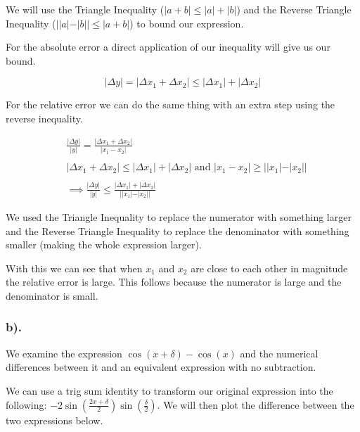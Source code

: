 \documentclass[11pt]{article}
\begin{document}
    We will use the Triangle Inequality (\(|a + b|\leq |a| + |b|\)) and the
Reverse Triangle Inequality (\(||a|-|b||\leq|a + b|\)) to bound our
expression.

For the absolute error a direct application of our inequality will give
us our bound.

\[
\boxed{|\Delta y| = |\Delta x_1 + \Delta x_2|\leq|\Delta x_1| + |\Delta x_2|}
\]

For the relative error we can do the same thing with an extra step using
the reverse inequality.

\begin{align}
    &\frac{|\Delta y|}{|y|}=\frac{|\Delta x_1 + \Delta x_2|}{|x_1 - x_2|}\\
    &~\\
    &|\Delta x_1 + \Delta x_2|\leq |\Delta x_1| + |\Delta x_2| \text{ and } |x_1 - x_2|\geq ||x_1| - |x_2||\\
    &~\\
    &\implies \boxed{\frac{|\Delta y|}{|y|}\leq \frac{|\Delta x_1| + |\Delta x_2|}{||x_1| - |x_2||}}
\end{align}

We used the Triangle Inequality to replace the numerator with something
larger and the Reverse Triangle Inequality to replace the denominator
with something smaller (making the whole expression larger).

    With this we can see that when \(x_1\) and \(x_2\) are close to each
other in magnitude the relative error is large. This follows because the
numerator is large and the denominator is small.

    \hypertarget{b.}{%
\subsubsection*{b).}\label{b.}}

We examine the expression \(\cos(x+\delta)-\cos(x)\) and the numerical
differences between it and an equivalent expression with no subtraction.

    We can use a trig sum identity to transform our original expression into
the following: \(-2\sin(\frac{2x+\delta}{2})\sin(\frac{\delta}{2})\). We
will then plot the difference between the two expressions below.
\end{document}
